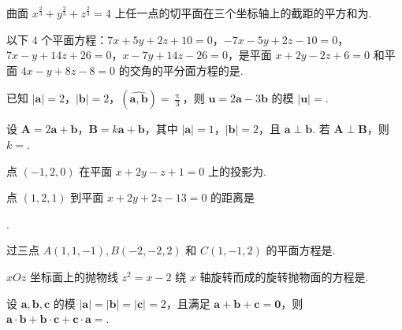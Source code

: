 	\begin{ti}
		曲面 $x^{\frac{2}{3}} + y^{\frac{2}{3}} + z^{\frac{2}{3}} = 4$ 上任一点的切平面在三个坐标轴上的截距的平方和为\kuo.

	\end{ti}

	\begin{ti}
		以下 $4$ 个平面方程：$7x + 5y + 2z + 10 = 0$，$-7x - 5y + 2z - 10 = 0$，$7x - y + 14z + 26 = 0$，$x - 7y + 14z - 26 = 0$，是平面 $x + 2y - 2z + 6 = 0$ 和平面 $4x - y + 8z - 8 = 0$ 的交角的平分面方程的是\kuo.

		\fourch{\circled{1}\circled{2}}{\circled{2}\circled{3}}{\circled{2}\circled{4}}{\circled{1}\circled{4}}
	\end{ti}

	\begin{ti}
		已知 $|\bm a| = 2$，$|\bm b| = 2$，$(\widehat{\bm a, \bm b}) = \frac{\uppi}{3}$，则 $\bm u = 2 \bm a - 3 \bm b$ 的模 $|\bm u| = $\htwo.
	\end{ti}

	\begin{ti}
		设 $\bm A = 2 \bm a + \bm b$，$\bm B = k \bm a + \bm b$，其中 $|\bm a| = 1$，$|\bm b| = 2$，且 $\bm a \perp \bm b$. 若 $\bm A \perp \bm B$，则 $k = $\htwo.
	\end{ti}

	\begin{ti}
		点 $(-1,2,0)$ 在平面 $x + 2y - z + 1 = 0$ 上的投影为\htwo.
	\end{ti}

	\begin{ti}
		点 $(1,2,1)$ 到平面 $x + 2y + 2z - 13 = 0$ 的距离是
		
		\noindent\htwo.
	\end{ti}

	\begin{ti}
		过三点 $A(1,1,-1), B(-2,-2,2)$ 和 $C(1,-1,2)$ 的平面方程是\htwo.
	\end{ti}

	\begin{ti}
		$xOz$ 坐标面上的抛物线 $z^{2} = x - 2$ 绕 $x$ 轴旋转而成的旋转抛物面的方程是\htwo.
	\end{ti}

	\begin{ti}
		设 $\bm a, \bm b, \bm c$ 的模 $|\bm a| = |\bm b| = |\bm c| = 2$，且满足 $\bm a + \bm b + \bm c = \bm 0$，则 $\bm a \cdot \bm b + \bm b \cdot \bm c + \bm c \cdot \bm a = $\htwo.
	\end{ti}

